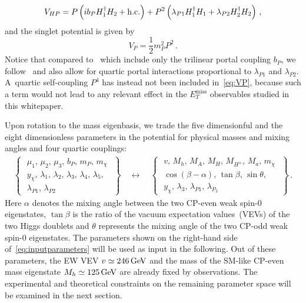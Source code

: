 \documentclass[a4paper, 11pt,notoc]{article}
\newcommand{\MET}{\ensuremath{E_T^\mathrm{miss}}\xspace}
\begin{document}
\begin{equation} \label{eq:VHP}
\begin{split}
V_{HP}  = P \left ( i  b_P   H_1^\dagger H_2 + {\rm h.c.} \right ) + P^2 \left (  \lambda_{P1}  H_1^\dagger H_1 +   \lambda_{P2}    H_2^\dagger H_2 \right )  \,,
\end{split} 
\end{equation}
and the singlet potential is given by 
\begin{equation} \label{eq:VP}
V_{P}  =  \frac{1}{2}  m_P^2  P^2  \,.
\end{equation}
Notice  that compared to~\cite{Ipek:2014gua,No:2015xqa,Goncalves:2016iyg,Tunney:2017yfp} which include only the trilinear portal coupling $b_P$, we  follow~\cite{Bauer:2017ota} and also allow for quartic portal interactions proportional to $\lambda_{P1}$ and  $\lambda_{P2}$. A~quartic self-coupling $P^4$ has instead not been included in~\eqref{eq:VP}, because such a term would not lead to any relevant effect in the $\MET$ observables studied in this whitepaper.

Upon rotation to the mass eigenbasis, we trade the five dimensionful and the eight dimensionless parameters in the potential  for physical masses and mixing angles and four quartic couplings:
\begin{align} \label{eq:inputparameters}
\left\{ \,\,\begin{matrix}
\mu_1,\,\mu_2,\,\mu_3,\,b_P,\,m_P,\,m_\chi\\[3pt]
y_\chi,\,\lambda_1,\,\lambda_2,\,\lambda_3,\,\lambda_4,\,\lambda_5,\\
\lambda_{P1},\,\lambda_{P2}
\end{matrix}\,\,\right\}\quad  \longleftrightarrow  \quad \left\{ \,\,\begin{matrix}
v,\,M_h,\,M_A,\,M_H,\,M_{H^\pm},\,M_a,\,m_\chi \\[3pt]
\cos(\beta-\alpha),\,\tan \beta,\,\sin  \theta,\\[3pt]
y_\chi,\,\lambda_3,\,\lambda_{P1},\,\lambda_{P_2}
\end{matrix}\,\,\right\}\,.
\end{align}
Here $\alpha$ denotes the mixing angle between the two CP-even weak spin-0 eigenstates, $\tan \beta$ is the ratio of the vacuum expectation values~(VEVs) of the two Higgs doublets and $\theta$ represents the mixing angle of the two CP-odd weak spin-0 eigenstates. The parameters shown on the right-hand side of~\eqref{eq:inputparameters} will be used as input in the following. Out of these  parameters, the EW VEV $v \simeq 246 \, {\rm GeV}$ and the mass of the SM-like CP-even mass eigenstate $M_h \simeq 125 \, {\rm GeV}$ are already fixed by observations. The experimental and theoretical constraints on the remaining parameter space will be examined in the next section. 
\end{document}
